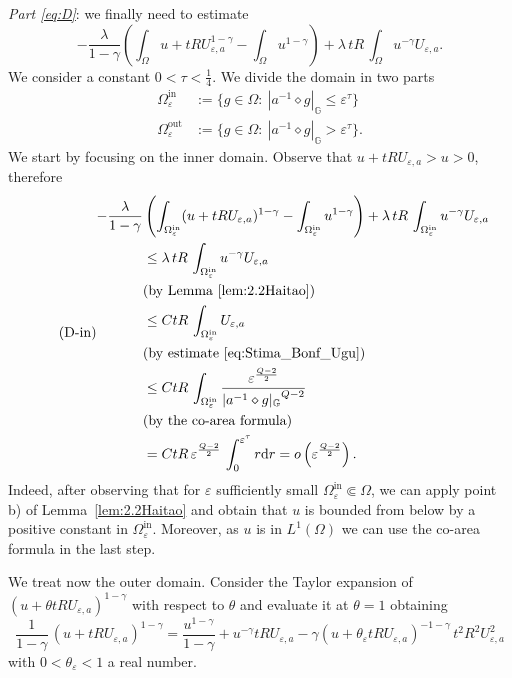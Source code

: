 \documentclass[11pt]{amsart}
\numberwithin{equation}{section} %
\theoremstyle{definition}
\def\d{\mathrm{d}}
\newcommand{\m}{\mbox}
\newcommand{\cor}{\textit}
\DeclareMathOperator{\In}{in}
\DeclareMathOperator{\Out}{out}
\def\din{\Omega^{\In}}
\def\dout{\Omega^{\Out}}
\begin{document}
\cor{Part \eqref{eq:D}}:
we finally need to estimate
\[
   -\frac{\lambda}{1-\gamma}\left(\int_\Omega u+tRU_{\varepsilon,a}^{1-\gamma}-\int_\Omega u^{1-\gamma}\right)+\lambda\, tR\, \int_\Omega u^{-\gamma}U_{\varepsilon,a}.
\]
We consider a constant $0<\tau<\frac{1}{4}$.
We divide the domain in two parts
\begin{align*}
\din_\varepsilon &:=\{g\in\Omega:\ |a^{-1}\diamond g|_{\mathbb{G}}\leq \varepsilon^{\tau}\}\\
\dout_\varepsilon&:=\{g\in \Omega:\ |a^{-1}\diamond g|_{\mathbb{G}}>\varepsilon^{\tau}\}.
\end{align*}
We start by focusing on the inner domain.
Observe that $u+tRU_{\varepsilon,a}>u>0$,
therefore 
\begin{equation}\label{in}\tag{D-in}
\begin{aligned}
    -\frac{\lambda}{1-\gamma}&\left(\int_{\din_\varepsilon}(u+tRU_{\varepsilon,a})^{1-\gamma}-\int_{\din_\varepsilon} u^{1-\gamma}\right) +\lambda\, tR\, \int_{\din_\varepsilon} u^{-\gamma}U_{\varepsilon,a}\\
    &\leq \lambda\, tR\, \int_{\din_\varepsilon} u^{-\gamma}U_{\varepsilon,a}\\
    &(\m{by Lemma \ref{lem:2.2Haitao}})\\
    &\leq CtR\, \int_{\din_\varepsilon}U_{\varepsilon,a}\\
    &(\m{by estimate \eqref{eq:Stima_Bonf_Ugu}})\\
    &\leq CtR\, \int_{\din_\varepsilon}\frac{\varepsilon^{\frac{Q-2}{2}}}{{|a^{-1}\diamond g|_{\mathbb{G}}}^{Q-2}}\\
    &(\m{by the co-area formula})\\
    &=CtR\, \varepsilon^{\frac{Q-2}{2}}\, \int_0^{\varepsilon^\tau}r\d r=o\left(\varepsilon^{\frac{Q-2}{2}}\right).
\end{aligned}
\end{equation}
Indeed, after observing that for $\varepsilon$ sufficiently small
$\din_\varepsilon\Subset \Omega$,
we can apply point b) of Lemma~\ref{lem:2.2Haitao}
and obtain that $u$ is bounded from below
by a positive constant in $\din_\varepsilon$.
Moreover, as $u$ is in $L^1(\Omega)$ we can use
the co-area formula in the last step.\newline

We treat now the outer domain.
Consider the Taylor expansion of $(u+\theta t R U_{\varepsilon,a})^{1-\gamma}$
with respect to $\theta$ and evaluate it at $\theta=1$ obtaining 
\[
\frac{1}{1-\gamma}\, (u+tRU_{\varepsilon,a})^{1-\gamma}=\frac{u^{1-\gamma}}{1-\gamma}+u^{-\gamma}tRU_{\varepsilon,a}-\gamma (u+\theta_\varepsilon tRU_{\varepsilon,a})^{-1-\gamma}\, t^2R^2U_{\varepsilon,a}^2
\]
with $0<\theta_\varepsilon<1$ a real number.
\end{document}
